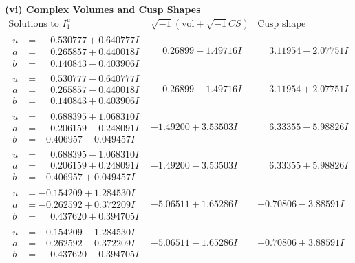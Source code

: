 \documentclass[1p]{elsarticle_modified}
\theoremstyle{definition}
\newcommand{\I}{\sqrt{-1}}
\begin{document}
\newpage\flushleft \textbf{(vi) Complex Volumes and Cusp Shapes}
$$\begin{array}{c|c|c}  
\text{Solutions to }I^u_{1}& \I (\text{vol} + \sqrt{-1}CS) & \text{Cusp shape}\\
 \hline 
\begin{aligned}
u &= \phantom{-}0.530777 + 0.640777 I \\
a &= \phantom{-}0.265857 + 0.440018 I \\
b &= \phantom{-}0.140843 - 0.403906 I\end{aligned}
 & \phantom{-}0.26899 + 1.49716 I & \phantom{-}3.11954 - 2.07751 I \\ \hline\begin{aligned}
u &= \phantom{-}0.530777 - 0.640777 I \\
a &= \phantom{-}0.265857 - 0.440018 I \\
b &= \phantom{-}0.140843 + 0.403906 I\end{aligned}
 & \phantom{-}0.26899 - 1.49716 I & \phantom{-}3.11954 + 2.07751 I \\ \hline\begin{aligned}
u &= \phantom{-}0.688395 + 1.068310 I \\
a &= \phantom{-}0.206159 - 0.248091 I \\
b &= -0.406957 - 0.049457 I\end{aligned}
 & -1.49200 + 3.53503 I & \phantom{-}6.33355 - 5.98826 I \\ \hline\begin{aligned}
u &= \phantom{-}0.688395 - 1.068310 I \\
a &= \phantom{-}0.206159 + 0.248091 I \\
b &= -0.406957 + 0.049457 I\end{aligned}
 & -1.49200 - 3.53503 I & \phantom{-}6.33355 + 5.98826 I \\ \hline\begin{aligned}
u &= -0.154209 + 1.284530 I \\
a &= -0.262592 + 0.372209 I \\
b &= \phantom{-}0.437620 + 0.394705 I\end{aligned}
 & -5.06511 + 1.65286 I & -0.70806 - 3.88591 I \\ \hline\begin{aligned}
u &= -0.154209 - 1.284530 I \\
a &= -0.262592 - 0.372209 I \\
b &= \phantom{-}0.437620 - 0.394705 I\end{aligned}
 & -5.06511 - 1.65286 I & -0.70806 + 3.88591 I \\ \hline\begin{aligned}

\end{aligned}
\end{array}$$
\end{document}
